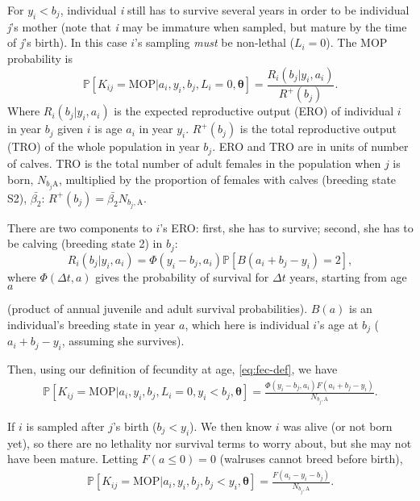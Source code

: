 For $y_{i}<b_{j}$, individual \emph{i} still has to survive several
years in order to be individual \emph{j}'s mother (note that \emph{i}
may be immature when sampled, but mature by the time of \emph{j}'s
birth). In this case $i$'s sampling \textit{must} be non-lethal ($L_{i}=0$).
The MOP probability is
\[
\mathbb{P}\left[K_{ij}=\text{MOP}\vert a_{i},y_{i},b_{j},L_{i}=0,\boldsymbol{\theta}\right]=\frac{R_{i}(b_{j}\vert y_{i},a_{i})}{R^{+}(b_{j})}.
\]
Where $R_{i}(b_{j}\vert y_{i},a_{i})$ is the expected reproductive
output (ERO) of individual $i$ in year $b_{j}$ given $i$ is age
$a_{i}$ in year $y_{i}$. $R^{+}(b_{j})$ is the total reproductive
output (TRO) of the whole population in year $b_{j}$. ERO and TRO
are in units of \textquotedbl number of calves\textquotedbl . TRO
is the total number of adult females in the population when $j$ is
born, $N_{b_{j}\text{A}}$, multiplied by the proportion of females
with calves (breeding state S2), $\bar{\beta_{2}}$: $R^{+}(b_{j})=\bar{\beta_{2}}N_{b_{j},\text{A}}$.

There are two components to $i$'s ERO: first, she has to survive;
second, she has to be calving (breeding state 2) in $b_{j}$:
\[
R_{i}\left(b_{j}\vert y_{i},a_{i}\right)=\Phi\left(y_{i}-b_{j},a_{i}\right)\mathbb{P}\left[B\left(a_{i}+b_{j}-y_{i}\right)=2\right],
\]
where $\Phi\left(\Delta t,a\right)$ gives the probability of survival
for $\Delta t$ years, starting from age $a$ %
\begin{comment}
Does (product...) indicate that an equation should go here or ...?
\end{comment}
(product of annual juvenile and adult survival probabilities). $B\left(a\right)$
is an individual's breeding state in year $a$, which here is individual
\emph{$i$}'s age at $b_{j}$ ($a_{i}+b_{j}-y_{i}$, assuming she
survives).

Then, using our definition of fecundity at age, \eqref{eq:fec-def},
we have
\begin{gather}
\mathbb{P}\left[K_{ij}=\text{MOP}\vert a_{i},y_{i},b_{j},L_{i}=0,y_{i}<b_{j},\boldsymbol{\theta}\right]=\frac{\Phi\left(y_{i}-b_{j},a_{i}\right)F\left(a_{i}+b_{j}-y_{i}\right)}{N_{b_{j},\text{A}}}.\label{eq:MOP-future}
\end{gather}

If \emph{$i$} is sampled after $j$'s birth ($b_{j}<y_{i}$). We
then know \emph{$i$} was alive (or not born yet), so there are no
lethality nor survival terms to worry about, but she may not have
been mature. Letting $F\left(a\leqslant0\right)=0$ (walruses cannot
breed before birth),
\begin{gather}
\mathbb{P}\left[K_{ij}=\text{MOP}\vert a_{i},y_{i},b_{j},b_{j}<y_{i},\boldsymbol{\theta}\right]=\frac{F\left(a_{i}-y_{i}-b_{j}\right)}{N_{b_{j},\text{A}}}.\label{eq:MOP-past}
\end{gather}


